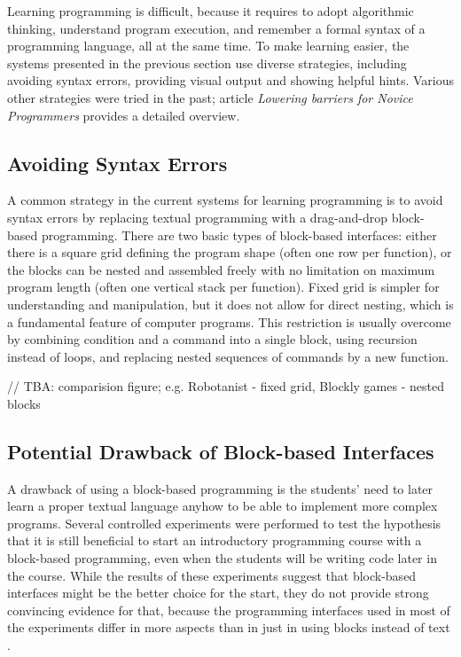 Learning programming is difficult,
  because it requires
  to adopt algorithmic thinking,
  understand program execution,
  and remember a formal syntax of a programming language,
  all at the same time.
To make learning easier,
  the systems presented in the previous section use diverse strategies,
  including avoiding syntax errors,
  providing visual output
  and showing helpful hints.
Various other strategies were tried in the past;
article \emph{Lowering barriers for Novice Programmers}
  \cite{lowering-barriers}
  provides a detailed overview.


\subsection{Avoiding Syntax Errors}
\label{sec:avoiding-syntax-errors}

A common strategy in the current systems for learning programming is to avoid syntax errors
  by replacing textual programming with a drag-and-drop block-based programming.
There are two basic types of block-based interfaces:
  either there is a square grid defining the program shape
  (often one row per function),
  or the blocks can be nested and assembled freely with no limitation on maximum program length
  (often one vertical stack per function).
Fixed grid is simpler for understanding and manipulation,
  but it does not allow for direct nesting,
  which is a fundamental feature of computer programs.
This restriction is usually overcome by
  combining condition and a command into a single block,
  using recursion instead of loops,
  and replacing nested sequences of commands by a new function.

// TBA: comparision figure; e.g. Robotanist - fixed grid, Blockly games - nested blocks


\subsection{Potential Drawback of Block-based Interfaces}
\label{sec:potential-drawback-of-block-based-interfaces}
A drawback of using a block-based programming
  is the students' need to later learn a proper textual language anyhow
  to be able to implement more complex programs.
Several controlled experiments were performed to test the hypothesis
  that it is still beneficial to start an introductory programming course
  with a block-based programming,
  even when the students will be writing code later in the course.
While the results of these experiments suggest that block-based interfaces
  might be the better choice for the start,
  they do not provide strong convincing evidence for that,
  because the programming interfaces used in most of the experiments differ in more aspects
  than in just in using blocks instead of text
  \cite{comparing-textual-and-block-interfaces}.

